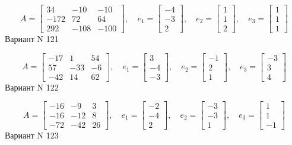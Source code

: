 \documentclass[11pt]{report}
\begin{document}
$$A = \left[\begin{matrix}34 & -10 & -10\\-172 & 72 & 64\\292 & -108 & -100\end{matrix}\right],\quad e_1 = \left[\begin{matrix}-4\\-3\\2\end{matrix}\right],\quad e_2 = \left[\begin{matrix}1\\1\\2\end{matrix}\right],\quad e_3 = \left[\begin{matrix}1\\1\\1\end{matrix}\right]$$Вариант N 121

$$A = \left[\begin{matrix}-17 & 1 & 54\\57 & -33 & -6\\-42 & 14 & 62\end{matrix}\right],\quad e_1 = \left[\begin{matrix}3\\-4\\-3\end{matrix}\right],\quad e_2 = \left[\begin{matrix}-1\\2\\1\end{matrix}\right],\quad e_3 = \left[\begin{matrix}-3\\3\\4\end{matrix}\right]$$Вариант N 122

$$A = \left[\begin{matrix}-16 & -9 & 3\\-16 & -12 & 8\\-72 & -42 & 26\end{matrix}\right],\quad e_1 = \left[\begin{matrix}-2\\-4\\2\end{matrix}\right],\quad e_2 = \left[\begin{matrix}-3\\-3\\1\end{matrix}\right],\quad e_3 = \left[\begin{matrix}1\\1\\-1\end{matrix}\right]$$Вариант N 123
\end{document}

